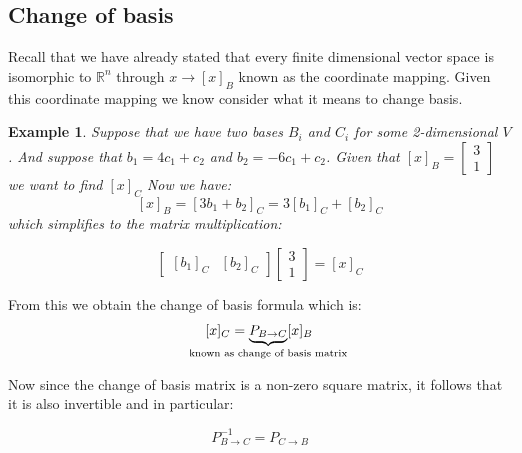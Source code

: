 \documentclass[titlepage]{article}
\newtheorem{exm}{Example}[subsection]
\numberwithin{equation}{subsection}
\newcommand{\Rn}{\mathbb{R}^n}
\begin{document}
\subsection{Change of basis}
Recall that we have already stated that every finite dimensional vector space is isomorphic to $\Rn$ through $x \to [x]_{B}$ known as the coordinate mapping. Given this coordinate mapping we know consider what it means to change basis.

\begin{exm}
Suppose that we have two bases $B_{i}$ and $C_{i}$ for some 2-dimensional $V$. And suppose that $b_{1} = 4c_{1}+c_{2}$ and $b_{2} = -6c_{1} + c_{2}$. Given that $[x]_{B} = \begin{bmatrix}
    3\\
    1
\end{bmatrix}$ we want to find $[x]_{C}$ Now we have:
$$ [x]_{B} = [3b_{1} + b_{2}]_{C} = 3[b_{1}]_{C} + [b_{2}]_{C} $$ which simplifies to the matrix multiplication:

$$ \begin{bmatrix}
    [b_{1}]_{C} & [b_{2}]_{C}
\end{bmatrix}\begin{bmatrix}
    3\\
    1
\end{bmatrix} = [x]_{C}$$ 
\end{exm}

From this we obtain the change of basis formula which is:
$$ [x]_{C} = \underbrace{P_{B \to C}}_{\text{\makebox[0pt]{known as change of basis matrix}}}[x]_{B} $$

Now since the change of basis matrix is a non-zero square matrix, it follows that it is also invertible and in particular:

$$P_{B \to C}^{-1} = P_{C \to B}$$
\end{document}
